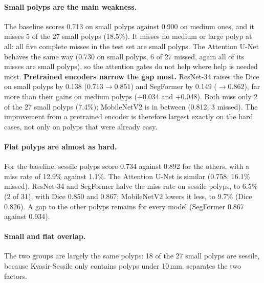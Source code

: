 \paragraph{Small polyps are the main weakness.} The baseline scores 0.713 on small polyps against 0.900 on medium ones,
and it misses 5 of the 27 small polyps (18.5\%). It misses no medium or large polyp at all: all five complete
misses in the test set are small polyps. The Attention U-Net behaves the same way (0.730 on small polyps, 6 of
27 missed, again all of its misses are small polyps), so the attention gates do not help where help is needed
most. \textbf{Pretrained encoders narrow the gap most.} ResNet-34 raises the Dice on small polyps by 0.138
($0.713 \rightarrow 0.851$) and SegFormer by 0.149 ($\rightarrow 0.862$), far more than their gains on medium polyps (+0.034 and
+0.048). Both miss only 2 of the 27 small polyps (7.4\%); MobileNetV2 is in between (0.812, 3 missed). The
improvement from a pretrained encoder is therefore largest exactly on the hard cases, not only on polyps that
were already easy.

\paragraph{Flat polyps are almost as hard.} For the baseline, sessile polyps score 0.734 against 0.892 for the others,
with a miss rate of 12.9\% against 1.1\%. The Attention U-Net is similar (0.758, 16.1\% missed). ResNet-34 and
SegFormer halve the miss rate on sessile polyps, to 6.5\% (2 of 31), with Dice 0.850 and 0.867; MobileNetV2
lowers it less, to 9.7\% (Dice 0.826). A gap to the other polyps remains for every model
(SegFormer 0.867 against 0.934).

\paragraph{Small and flat overlap.} The two groups are largely the same polyps: 18 of the 27 small polyps are sessile,
because Kvasir-Sessile only contains polyps under 10\,mm.  separates the two factors.

